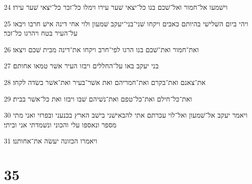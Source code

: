 \par 24 וישׁמעו אל־חמור ואל־שׁכם בנו כל־יצאי שׁער עירו וימלו כל־זכר כל־יצאי שׁער עירו׃
\par 25 ויהי ביום השׁלישׁי בהיותם כאבים ויקחו שׁני־בני־יעקב שׁמעון ולוי אחי דינה אישׁ חרבו ויבאו על־העיר בטח ויהרגו כל־זכר׃
\par 26 ואת־חמור ואת־שׁכם בנו הרגו לפי־חרב ויקחו את־דינה מבית שׁכם ויצאו׃
\par 27 בני יעקב באו על־החללים ויבזו העיר אשׁר טמאו אחותם׃
\par 28 את־צאנם ואת־בקרם ואת־חמריהם ואת אשׁר־בעיר ואת־אשׁר בשׂדה לקחו׃
\par 29 ואת־כל־חילם ואת־כל־טפם ואת־נשׁיהם שׁבו ויבזו ואת כל־אשׁר בבית׃
\par 30 ויאמר יעקב אל־שׁמעון ואל־לוי עכרתם אתי להבאישׁני בישׁב הארץ בכנעני ובפרזי ואני מתי מספר ונאספו עלי והכוני ונשׁמדתי אני וביתי׃
\par 31 ויאמרו הכזונה יעשׂה את־אחותנו׃

\chapter{35}

